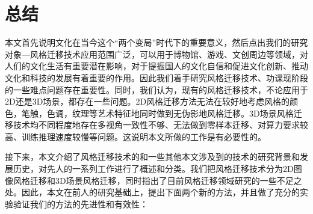 \section{总结}
本文首先说明文化在当今这个“两个变局”时代下的重要意义，然后点出我们的研究对象—风格迁移技术应用范围广泛，可以用于博物馆、游戏、文创周边等领域，对人们的文化生活有重要潜在影响，对于提振国人的文化自信和促进文化创新、推动文化和科技的发展有着重要的作用。因此我们着手研究风格迁移技术、功课现阶段的一些难点问题存在重要性。同时，我们认为，现有的风格迁移技术，不论应用于2D还是3D场景，都存在一些问题。2D风格迁移方法无法在较好地考虑风格的颜色，笔触，色调，纹理等艺术特征地同时做到无伪影地风格迁移。3D场景风格迁移技术均不同程度地存在多视角一致性不够、无法做到零样本迁移、对算力要求较高、训练推理速度较慢等问题。这说明本文所做的工作是有必要性的。
\par 接下来，本文介绍了风格迁移技术的和一些其他本文涉及到的技术的研究背景和发展历史，对先人的一系列工作进行了概述和分类。我们把风格迁移技术分为2D图像风格迁移和3D场景风格迁移，同时指出了目前风格迁移领域研究的一些不足之处。因此，本文在前人的研究基础上，提出下面两个新的方法，并且做了充分的实验验证我们的方法的先进性和有效性：

